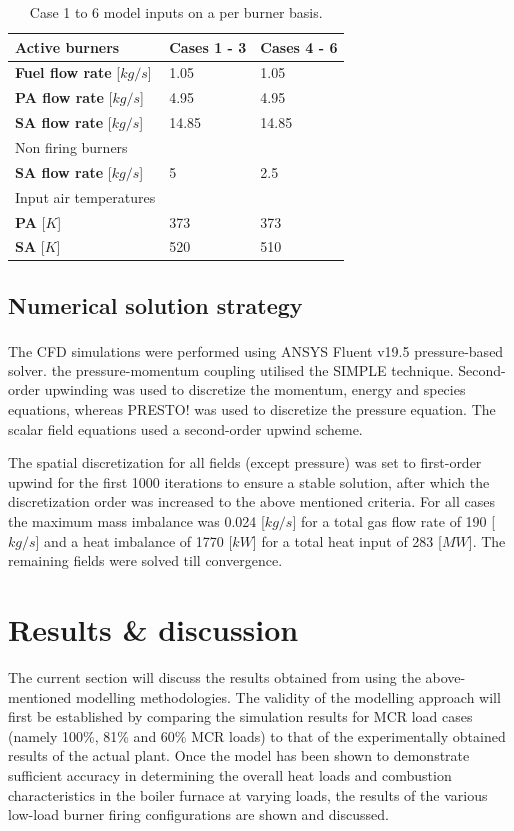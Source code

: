 \documentclass[review]{elsarticle}
\begin{document}
\begin{table}[h!]
\centering
\caption{Case 1 to 6 model inputs on a per burner basis.}
\label{tbl_case_inputs}
\vspace{5mm}
\label{fuel}
{\tabulinesep=1.2mm
\begin{tabularx}{\textwidth}{p{} p{} l}
\hline
Active burners & \textbf{Cases 1 - 3} & \textbf{Cases 4 - 6}\\
\hline
\textbf{Fuel flow rate} [$kg/s$]&1.05  &1.05\\
\textbf{PA flow rate} [$kg/s$]&4.95  &4.95\\
\textbf{SA flow rate} [$kg/s$]&14.85  &14.85\\
\hline
Non firing burners &  & \\
\hline
\textbf{SA flow rate} [$kg/s$]&5  &2.5\\
\hline
Input air temperatures& &\\
\hline
\textbf{PA} [$K$]&373  &373\\
\textbf{SA} [$K$]&520  &510\\
\hline
\end{tabularx}}
\end{table}

\subsection{Numerical solution strategy} 

The CFD simulations were performed using ANSYS Fluent v19.5\textsuperscript{\textregistered} pressure-based solver. the pressure-momentum coupling utilised the SIMPLE technique. Second-order upwinding was used to discretize the momentum, energy and species equations, whereas PRESTO! was used to discretize the pressure equation. The scalar field equations used a second-order upwind scheme.

The spatial discretization for all fields (except pressure) was set to first-order upwind for the first 1000 iterations to ensure a stable solution, after which the discretization order was increased to the above mentioned criteria. For all cases the maximum mass imbalance was 0.024 [$kg/s$] for a total gas flow rate of 190 [$kg/s$] and a heat imbalance of 1770 [$kW$] for a total heat input of 283 [$MW$]. The remaining fields were solved till convergence.

\section{Results \& discussion}
The current section will discuss the results obtained from using the above-mentioned modelling methodologies. The validity of the modelling approach will first be established by comparing the simulation results for MCR load cases (namely 100\%, 81\% and 60\% MCR loads) to that of the experimentally obtained results of the actual plant. Once the model has been shown to demonstrate sufficient accuracy in determining the overall heat loads and combustion characteristics in the boiler furnace at varying loads, the results of the various low-load burner firing configurations are shown and discussed.
\end{document}
